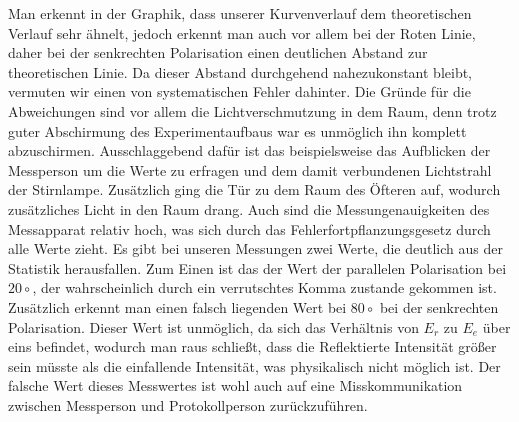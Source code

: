 Man erkennt in der Graphik, dass unserer Kurvenverlauf dem theoretischen Verlauf sehr ähnelt, jedoch erkennt man auch vor allem bei der Roten Linie, daher bei der senkrechten Polarisation einen deutlichen Abstand zur theoretischen Linie. Da dieser Abstand durchgehend nahezukonstant bleibt, vermuten wir einen von systematischen Fehler dahinter.  Die Gründe für die Abweichungen sind vor allem die Lichtverschmutzung in dem Raum, denn trotz guter Abschirmung des Experimentaufbaus war es unmöglich ihn komplett abzuschirmen. Ausschlaggebend dafür ist das beispielsweise das Aufblicken der Messperson um die Werte zu erfragen und dem damit verbundenen Lichtstrahl der Stirnlampe. Zusätzlich ging die Tür zu dem Raum des Öfteren auf, wodurch zusätzliches Licht in den Raum drang.  Auch sind die Messungenauigkeiten des Messapparat relativ hoch, was sich durch das Fehlerfortpflanzungsgesetz durch alle Werte zieht. 
Es gibt bei unseren Messungen zwei Werte, die deutlich aus der Statistik herausfallen. Zum Einen ist das der Wert der parallelen Polarisation bei $20 \circ$, der wahrscheinlich durch ein verrutschtes Komma zustande gekommen ist. Zusätzlich erkennt man einen falsch liegenden Wert bei $80\circ$ bei der senkrechten Polarisation. Dieser Wert ist unmöglich, da sich das Verhältnis von $E_r$ zu $E_e$ über eins befindet, wodurch man raus schließt, dass die Reflektierte Intensität größer sein müsste als die einfallende Intensität, was physikalisch nicht möglich ist. Der falsche Wert dieses Messwertes ist wohl auch auf eine Misskommunikation zwischen Messperson und Protokollperson zurückzuführen.





